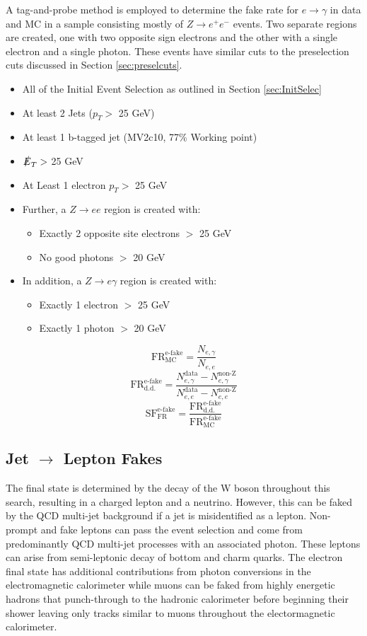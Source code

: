 A tag-and-probe method is employed to determine the fake rate for $e\rightarrow \gamma$ in data and MC in a sample consisting mostly of $Z\rightarrow e^+ e^-$ events.  Two separate regions are created, one with two opposite sign electrons and the other with a single electron and a single photon.  These events have similar cuts to the preselection cuts discussed in Section \ref{sec:preselcuts}.
\begin{itemize}
\item All of the Initial Event Selection as outlined in Section \ref{sec:InitSelec}
\item At least 2 Jets  ($p_T >$ 25 GeV) 
\item At least 1 b-tagged jet (MV2c10, 77\% Working point)
\item $\slashed{E}_T >$ 25 GeV
\item At Least 1 electron $p_T >$ 25 GeV
\item Further, a $Z\rightarrow ee$ region is created with:
	\begin{itemize}
	\item Exactly 2 opposite site electrons $>$ 25 GeV
	\item No good photons $>$ 20 GeV
	\end{itemize}
\item In addition, a $Z\rightarrow e\gamma$ region is created with:
	\begin{itemize}
	\item Exactly 1 electron $>$ 25 GeV
	\item Exactly 1 photon $>$ 20 GeV
	\end{itemize}
\end{itemize}
\[ \text{FR}_{\text{MC}}^{\text{e-fake}} = \frac{N_{e,\gamma}}{N_{e,e}} \]
\[ \text{FR}_{\text{d.d.}}^{\text{e-fake}} = \frac{N_{e,\gamma}^{\text{data}}-N_{e,\gamma}^{\text{non-Z}}}{N_{e,e}^{\text{data}}-N_{e,e}^{\text{non-Z}}} \]
\[  \text{SF}_{\text{FR}}^{\text{e-fake}} =\frac{ \text{FR}_{\text{d.d.}}^{\text{e-fake}}}{ \text{FR}_{\text{MC}}^{\text{e-fake}} }\]


\subsection{Jet $\rightarrow$ Lepton Fakes}
\label{sec:FakeLep}
The final state is determined by the decay of the W boson throughout this search, resulting in a charged lepton and a neutrino.  However, this can be faked by the QCD multi-jet background if a jet is misidentified as a lepton.  Non-prompt and fake leptons can pass the event selection and come from predominantly QCD multi-jet processes with an associated photon.  These leptons can arise from semi-leptonic decay of bottom and charm quarks.  The electron final state has additional contributions from photon conversions in the electromagnetic calorimeter while muons can be faked from highly energetic hadrons that punch-through to the hadronic calorimeter before beginning their shower leaving only tracks similar to muons throughout the electormagnetic calorimeter.  

